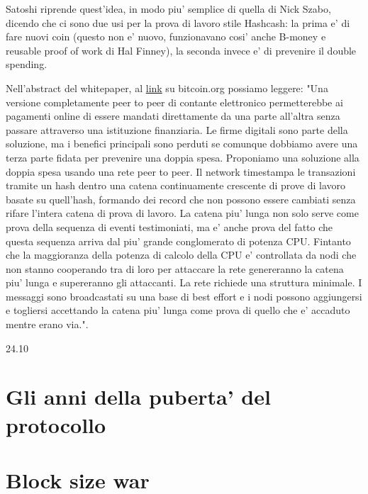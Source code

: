 \documentclass{article}
\begin{document}
Satoshi riprende quest'idea, in modo piu' semplice di quella di Nick Szabo, dicendo che ci sono due usi per la prova di lavoro stile Hashcash: la prima e' di fare nuovi coin (questo non e' nuovo, funzionavano cosi' anche B-money e reusable proof of work di Hal Finney), la seconda invece e' di prevenire il double spending.

Nell'abstract del whitepaper, al \href{https://bitcoin.org/bitcoin.pdf}{link} su bitcoin.org possiamo leggere: "Una versione completamente peer to peer di contante elettronico permetterebbe ai pagamenti online di essere mandati direttamente da una parte all'altra senza passare attraverso una istituzione finanziaria. Le firme digitali sono parte della soluzione, ma i benefici principali sono perduti se comunque dobbiamo avere una terza parte fidata per prevenire una doppia spesa. Proponiamo una soluzione alla doppia spesa usando una rete peer to peer. Il network timestampa le transazioni tramite un hash dentro una catena continuamente crescente di prove di lavoro basate su quell'hash, formando dei record che non possono essere cambiati senza rifare l'intera catena di prova di lavoro. La catena piu' lunga non solo serve come prova della sequenza di eventi testimoniati, ma e' anche prova del fatto che questa sequenza arriva dal piu' grande conglomerato di potenza CPU. Fintanto che la maggioranza della potenza di calcolo della CPU e' controllata da nodi che non stanno cooperando tra di loro per attaccare la rete genereranno la catena piu' lunga e supereranno gli attaccanti. La rete richiede una struttura minimale. I messaggi sono broadcastati su una base di best effort e i nodi possono aggiungersi e togliersi accettando la catena piu' lunga come prova di quello che e' accaduto mentre erano via.".

24.10

\section{Gli anni della puberta' del protocollo}

\section{Block size war}
\end{document}
